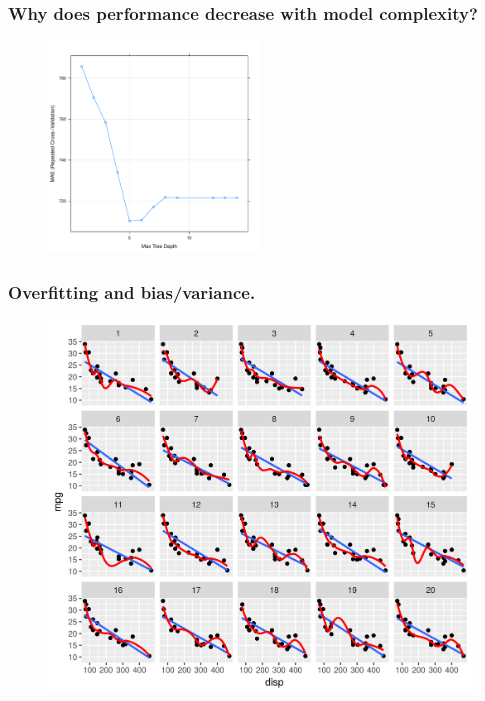 \documentclass[handout, aspectratio = 169]{beamer}
\begin{document}
\begin{frame}
\frametitle{Why does performance decrease  with model complexity?}
\vspace{-4mm}
\begin{figure}
    \includegraphics[width = 0.5\textwidth]{rpart_perf.pdf}
\end{figure} 

\end{frame} 


\begin{frame}
\frametitle{Overfitting and bias/variance.}

\begin{figure}
    \includegraphics[height = 0.8\textheight]{bias-variance.png}
\end{figure} 

\end{frame} 
\end{document}
